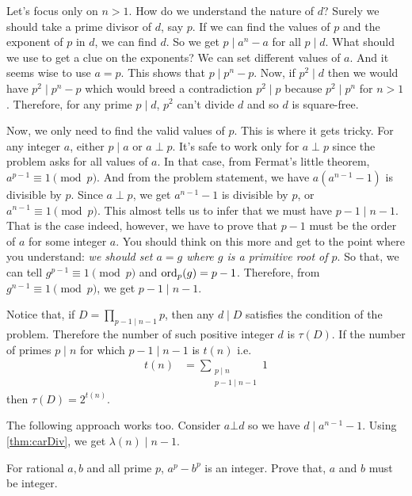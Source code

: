 \documentclass[problems.tex]{subfile}
\begin{document}
	\begin{solution}
		Let's focus only on $n>1$. How do we understand the nature of $d$? Surely we should take a prime divisor of $d$, say $p$. If we can find the values of $p$ and the exponent of $p$ in $d$, we can find $d$. So we get $p\mid a^n-a$ for all $p\mid d$. What should we use to get a clue on the exponents? We can set different values of $a$. And it seems wise to use $a=p$. This shows that $p\mid p^n-p$. Now, if $p^2\mid d$ then we would have $p^2\mid p^n-p$ which would breed a contradiction $p^2\mid p$ because $p^2\mid p^n$ for $n>1$. Therefore, for any prime $p\mid d$, $p^2$ can't divide $d$ and so $d$ is square-free.

		Now, we only need to find the valid values of $p$. This is where it gets tricky. For any integer $a$, either $p\mid a$ or $a\perp p$. It's safe to work only for $a\perp p$ since the problem asks for all values of $a$. In that case, from Fermat's little theorem, $a^{p-1}\equiv1\pmod p$. And from the problem statement, we have $a(a^{n-1}-1)$ is divisible by $p$. Since $a\perp p$, we get $a^{n-1}-1$ is divisible by $p$, or $a^{n-1}\equiv1\pmod p$. This almost tells us to infer that we must have $p-1\mid n-1$. That is the case indeed, however, we have to prove that $p-1$ must be the order of $a$ for some integer $a$. You should think on this more and get to the point where you understand: \textit{we should set $a=g$ where $g$ is a primitive root of $p$}. So that, we can tell $g^{p-1}\equiv1\pmod p$ and $\operatorname{ord}_p(g)=p-1$. Therefore, from $g^{n-1}\equiv1\pmod p$, we get $p-1\mid n-1$.

		Notice that, if $D=\prod\limits_{p-1\mid n-1}p$, then any $d\mid D$ satisfies the condition of the problem. Therefore the number of such positive integer $d$ is $\tau(D)$. If the number of primes $p\mid n$ for which $p-1\mid n-1$ is $t(n)$ i.e.
			\begin{align*}
				t(n) & = \sum\limits_{\substack{p\mid n\\p-1\mid n-1}}1
			\end{align*}
		then $\tau(D) = 2^{t(n)}$.
	\end{solution}

	\begin{note}
		The following approach works too. Consider $a\bot d$ so we have $d\mid a^{n-1}-1$. Using \autoref{thm:carDiv}, we get $\lambda(n)\mid n-1$.
	\end{note}

	\begin{problem}
		For rational $a,b$ and all prime $p$, $a^p-b^p$ is an integer. Prove that, $a$ and $b$ must be integer.
	\end{problem}
\end{document}
